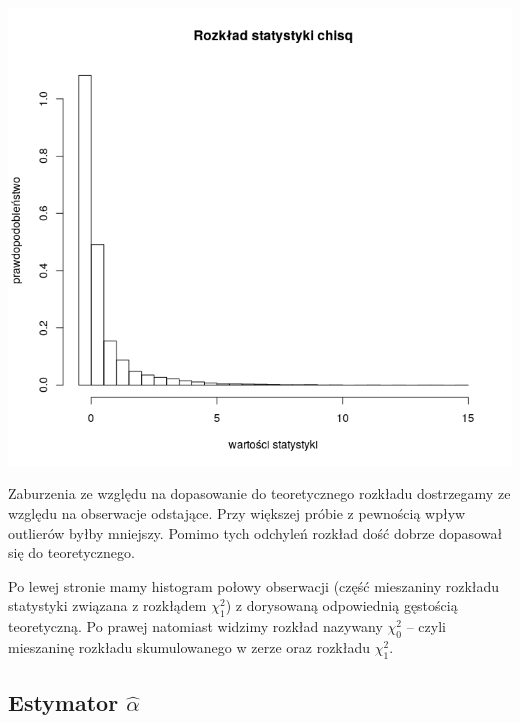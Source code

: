 \documentclass[a4paper,11pt]{article}
\begin{document}
\includegraphics[scale=.3]{Rplot99.png} 

Zaburzenia ze względu na dopasowanie do teoretycznego rozkładu dostrzegamy ze względu na obserwacje odstające. Przy większej próbie z  pewnością wpływ outlierów byłby mniejszy. Pomimo tych odchyleń rozkład dość dobrze dopasował się do teoretycznego.

Po lewej stronie mamy histogram połowy obserwacji (część mieszaniny rozkładu statystyki związana z rozkłądem $\chi^{2}_{1}$)  z dorysowaną odpowiednią gęstością teoretyczną. Po prawej natomiast widzimy rozkład  nazywany $\chi^{2}_{0}$ --  czyli mieszaninę rozkładu skumulowanego w zerze oraz rozkładu  $\chi^{2}_{1}$. 

\subsection{Estymator $\widehat{\alpha}$} 
\end{document}
